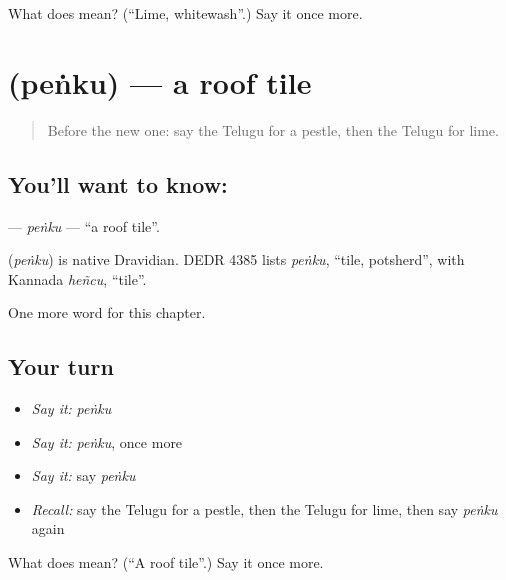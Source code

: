 \begin{tcolorbox}[breakable,colback=teal!4,colframe=teal!35!black,title={Before you move on}]
What does  mean? (\textquotedblleft{}Lime, whitewash\textquotedblright{}.) Say it once more.
\end{tcolorbox}
\section[\texorpdfstring{\te{పెంకు} (peṅku)}{పెంకు (peṅku)}]{ (peṅku) — a roof tile}

\label{lesson:TE-C271-penku}



\begin{quote}
Before the new one: say the Telugu for a pestle, then the Telugu for lime.
\end{quote}

\subsection*{You'll want to know: }
\textbf{} — \emph{peṅku} — \textquotedblleft{}a roof tile\textquotedblright{}.

\begin{cousinweb}
\textbf{} (\emph{peṅku}) is native Dravidian. DEDR 4385 lists \emph{peṅku}, \textquotedblleft{}tile, potsherd\textquotedblright{}, with Kannada \emph{heñcu}, \textquotedblleft{}tile\textquotedblright{}.
\end{cousinweb}

\begin{grammarlens}[title={What you've built}]
One more word for this chapter.
\end{grammarlens}

\subsection*{Your turn}
\begin{itemize}
\raggedright
  \item \emph{Say it:} \emph{peṅku}
  \item \emph{Say it:} \emph{peṅku}, once more
  \item \emph{Say it:} say \emph{peṅku}
  \item \emph{Recall:} say the Telugu for a pestle, then the Telugu for lime, then say \emph{peṅku} again
\end{itemize}

\begin{tcolorbox}[breakable,colback=teal!4,colframe=teal!35!black,title={Before you move on}]
What does  mean? (\textquotedblleft{}A roof tile\textquotedblright{}.) Say it once more.
\end{tcolorbox}
